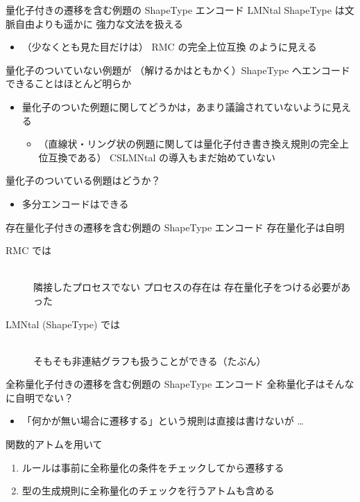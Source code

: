 \documentclass[presentation, xetex]{beamer}
\begin{document}
\begin{frame}[label={sec:org28cdcf4}]{量化子付きの遷移を含む例題の ShapeType エンコード}
LMNtal ShapeType は文脈自由よりも遥かに \alert{\alert{強力な文法を扱える}}
\begin{itemize}
\item （少なくとも見た目だけは） \alert{\alert{RMC の完全上位互換}} のように見える
\end{itemize}


量化子のついていない例題が
（解けるかはともかく）ShapeType へエンコードできることはほとんど明らか
\begin{itemize}
\item 量化子のついた例題に関してどうかは，あまり議論されていないように見える
\begin{itemize}
\item （直線状・リング状の例題に関しては量化子付き書き換え規則の完全上位互換である）
CSLMNtal の導入もまだ始めていない
\end{itemize}
\end{itemize}


量化子のついている例題はどうか？
\begin{itemize}
\item 多分エンコードはできる
\end{itemize}
\end{frame}



\begin{frame}[label={sec:orga5f7871}]{存在量化子付きの遷移を含む例題の ShapeType エンコード}
存在量化子は自明
\begin{description}
\item[{RMC では}] \mbox{}\\
\alert{\alert{隣接したプロセスでない}} プロセスの存在は
存在量化子をつける必要があった
\item[{LMNtal (ShapeType) では}] \mbox{}\\
そもそも非連結グラフも扱うことができる（たぶん）
\end{description}
\end{frame}


\begin{frame}[label={sec:orgcc241df}]{全称量化子付きの遷移を含む例題の ShapeType エンコード}
全称量化子はそんなに自明でない？
\begin{itemize}
\item 「何かが無い場合に遷移する」という規則は直接は書けないが \dots{}
\end{itemize}


関数的アトムを用いて
\begin{enumerate}
\item ルールは事前に全称量化の条件をチェックしてから遷移する
\item 型の生成規則に全称量化のチェックを行うアトムも含める
\end{enumerate}
\end{frame}
\end{document}

